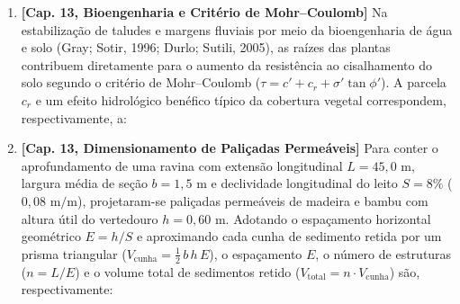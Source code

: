 \begin{enumerate}[leftmargin=1.8em, itemsep=8pt]
  \item \textbf{[Cap. 13, Bioengenharia e Critério de Mohr--Coulomb]} Na estabilização de taludes e margens fluviais por meio da bioengenharia de água e solo (Gray; Sotir, 1996; Durlo; Sutili, 2005), as raízes das plantas contribuem diretamente para o aumento da resistência ao cisalhamento do solo segundo o critério de Mohr--Coulomb ($\tau = c' + c_r + \sigma'\tan\phi'$). A parcela $c_r$ e um efeito hidrológico benéfico típico da cobertura vegetal correspondem, respectivamente, a:

  \item \textbf{[Cap. 13, Dimensionamento de Paliçadas Permeáveis]} Para conter o aprofundamento de uma ravina com extensão longitudinal $L = 45{,}0\text{ m}$, largura média de seção $b = 1{,}5\text{ m}$ e declividade longitudinal do leito $S = 8\%$ ($0{,}08\text{ m/m}$), projetaram-se paliçadas permeáveis de madeira e bambu com altura útil do vertedouro $h = 0{,}60\text{ m}$. Adotando o espaçamento horizontal geométrico $E = h / S$ e aproximando cada cunha de sedimento retida por um prisma triangular ($V_{\text{cunha}} = \tfrac{1}{2}\,b\,h\,E$), o espaçamento $E$, o número de estruturas ($n = L / E$) e o volume total de sedimentos retido ($V_{\text{total}} = n \cdot V_{\text{cunha}}$) são, respectivamente:


\end{enumerate}
